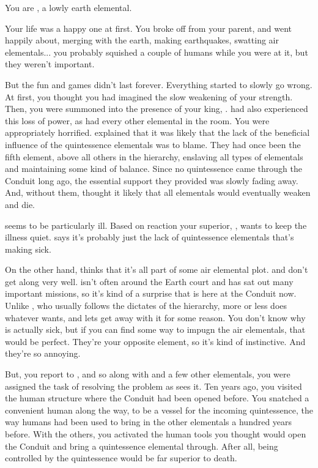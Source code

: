 \documentclass[char]{elementals}
\begin{document}
\name{\cMinion{}}

You are \cMinion{\intro}, a lowly earth elemental.

Your life was a happy one at first.  You broke off from your parent, and went happily about, merging with the earth, making earthquakes, swatting air elementals... you probably squished a couple of humans while you were at it, but they weren't important.

But the fun and games didn't last forever.  Everything started to slowly go wrong.  At first, you thought you had imagined the slow weakening of your strength.  Then, you were summoned into the presence of your king, \cEarthKing{\intro}.  \cEarthKing{\They} had also experienced this loss of power, as had every other elemental in the room.  You were appropriately horrified.  \cEarthKing{} explained that it was likely that the lack of the beneficial influence of the quintessence elementals was to blame.  They had once been the fifth element, above all others in the hierarchy, enslaving all types of elementals and maintaining some kind of balance.  Since no quintessence came through the Conduit long ago, the essential support they provided was slowly fading away.  And, without them, \cEarthKing{} thought it likely that all elementals would eventually weaken and die.  

\cEarthKing{} seems to be particularly ill. Based on \cEarthKing{\their} reaction your superior, \cLoyal{\intro}, wants to keep the illness quiet.  \cLoyal{} says it's probably just the lack of quintessence elementals that's making \cEarthKing{} sick.

On the other hand, \cRogue{\intro} thinks that it's all part of some air elemental plot.  \cLoyal{} and \cRogue{} don't get along very well.  \cRogue{} isn't often around the Earth court and has sat out many important missions, so it's kind of a surprise that \cRogue{\they} is here at the Conduit now.  Unlike \cLoyal{}, who usually follows the dictates of the hierarchy, \cRogue{} more or less does whatever  wants, and \cEarthKing{} lets \cRogue{\them} get away with it for some reason.  You don't know why \cEarthKing{} is actually sick, but if you can find some way to impugn the air elementals, that would be perfect.  They're your opposite element, so it's kind of instinctive.  And they're so annoying.

But, you report to \cLoyal{}, and so along with \cLoyal{\them} and a few other elementals, you were assigned the task of resolving the problem as \cEarthKing{} sees it.  Ten years ago, you visited the human structure where the Conduit had been opened before.  You snatched a convenient human along the way, to be a vessel for the incoming quintessence, the way humans had been used to bring in the other elementals a hundred years before.  With the others, you activated the human tools you thought would open the Conduit and bring a quintessence elemental through.  After all, being controlled by the quintessence would be far superior to death.
\end{document}
